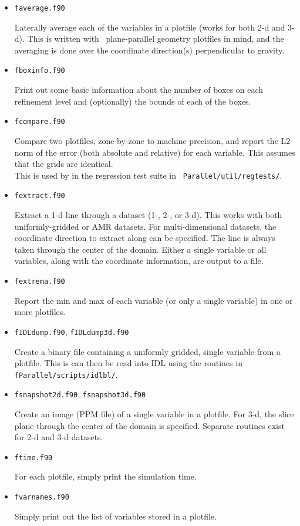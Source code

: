 \begin{itemize}

\item {\tt faverage.f90}

  Laterally average each of the variables in a plotfile (works for
  both 2-d and 3-d).  This is written with \maestro\
  plane-parallel geometry plotfiles in mind, and the averaging is done
  over the coordinate direction(s) perpendicular to gravity.


\item {\tt fboxinfo.f90}

  Print out some basic information about the number of boxes on each
  refinement level and (optionally) the bounds of each of the boxes.

\item {\tt fcompare.f90}

  Compare two plotfiles, zone-by-zone to machine precision, and report
  the L2-norm of the error (both absolute and relative) for each
  variable.  This assumes that the grids are identical. \\[-3mm]

  This is used by in the regression test suite in {\tt
  Parallel/util/regtests/}.


\item {\tt fextract.f90}

  Extract a 1-d line through a dataset (1-, 2-, or 3-d).  This works
  with both uniformly-gridded or AMR datasets.  For multi-dimensional
  datasets, the coordinate direction to extract along can be specified.
  The line is always taken through the center of the domain.  Either
  a single variable or all variables, along with the coordinate 
  information, are output to a file.
  

\item {\tt fextrema.f90}

  Report the min and max of each variable (or only a single variable)
  in one or more plotfiles.


\item {\tt fIDLdump.f90}, {\tt fIDLdump3d.f90}

  Create a binary file containing a uniformly gridded, single variable
  from a plotfile.  This is can then be read into IDL using the routines
  in {\tt fParallel/scripts/idlbl/}.


\item {\tt fsnapshot2d.f90}, {\tt fsnapshot3d.f90}

  Create an image (PPM file) of a single variable in a plotfile.  For
  3-d, the slice plane through the center of the domain is specified.
  Separate routines exist for 2-d and 3-d datasets.
  

\item {\tt ftime.f90}
 
  For each plotfile, simply print the simulation time.


\item {\tt fvarnames.f90}

  Simply print out the list of variables stored in a plotfile.


\end{itemize}

